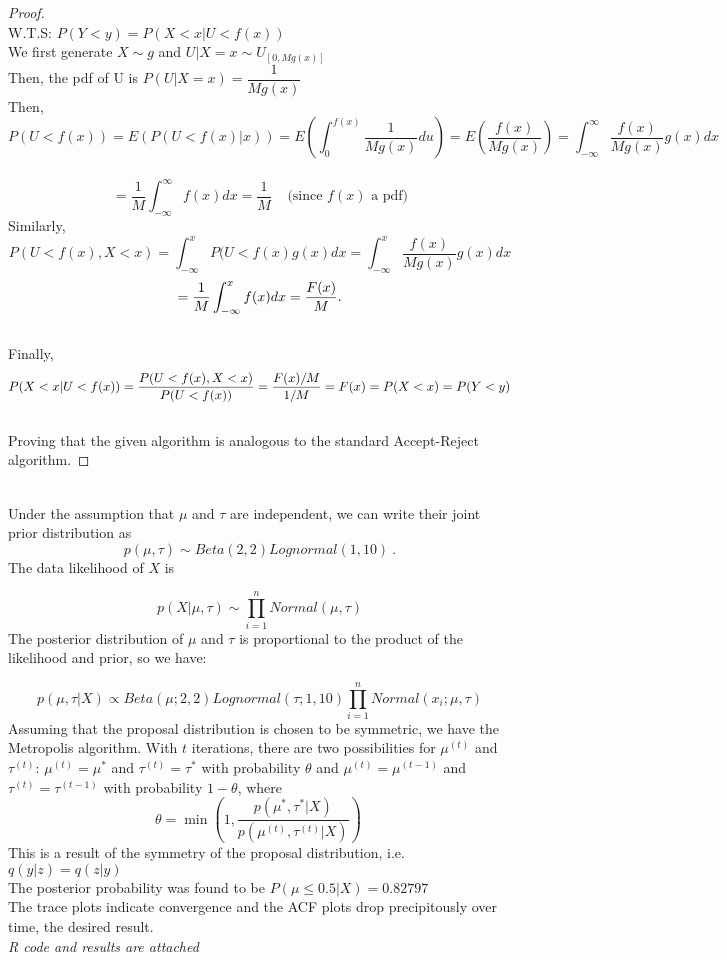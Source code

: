 \documentclass[10pt,a4paper]{article}
\begin{document}
\begin{problem}{2}
\begin{proof}
\text{ }\\
W.T.S: $P(Y<y)=P(X<x|U<f(x)) $\\
We first generate $X\sim g$ and $U|X=x\sim U_{[0,Mg(x)]}$\\
Then, the pdf of U is $P(U|X=x)=\dfrac{1}{Mg(x)}$\\
Then,
$$P(U<f(x))= E(P(U<f(x)|x))=E(\int_{0}^{f(x)}\frac{1}{Mg(x)}du)=E(\frac{f(x)}{Mg(x)})=\int_{-\infty}^{\infty}\frac{f(x)}{Mg(x)}g(x)dx$$\\
$$=\frac{1}{M}\int_{-\infty}^{\infty}f(x)dx
=\frac{1}{M} \ \ \ \ \ \textrm{(since $f(x)$ a pdf)}$$
Similarly,
$$P(U<f(x), X<x)=\int_{-\infty}^{x}P(U<f(x)g(x)dx=\int_{-\infty}^{x}\frac{f(x)}{Mg(x)}g(x)dx$$
$$=\frac{1}{M}\int_{-\infty}^{x}f(x)dx\\
=\frac{F(x)}{M}.$$\\
Finally,\\
$$P(X<x|U<f(x))=\frac{P(U<f(x),X<x)}{P(U<f(x))} \\
=\frac{F(x)/M}{1/M}\\
=F(x)\\
=P(X<x)\\
=P(Y<y)$$\\
Proving that the given algorithm is analogous to the standard Accept-Reject algorithm.
\end{proof}
\end{problem}


\begin{problem}{3}
\text{ }\\
Under the assumption that $\mu$ and $\tau$ are independent, we can write their joint prior distribution as
$$
p(\mu,\tau)\sim Beta(2,2)Lognormal(1,10)\ .
$$
The data likelihood of $X$ is

$$p(X|\displaystyle \mu,\tau)\sim\prod_{i=1}^{n} Normal(\mu, \tau)$$
The posterior distribution of $\mu$ and $\tau$ is proportional to the product of the likelihood and prior, so we have:

$$p(\mu,\tau|X)\propto Beta(\mu; 2,2) Lognormal(\displaystyle \tau;1,10)\prod_{i=1}^{n} Normal(x_i; \mu, \tau)$$
Assuming that the proposal distribution is chosen to be symmetric, we have the Metropolis algorithm. With $t$ iterations, there are two possibilities for $\mu^{(t)}$ and $\tau^{(t)}$: $\mu^{(t)}=\mu^{*}$ and $\tau^{(t)}=\tau^{*}$ with probability $\theta$ and $\mu^{(t)}=\mu^{(t-1)}$ and $\tau^{(t)}=\tau^{(t-1)}$ with probability $1-\theta$, where 
$$
\theta=\min(1,\frac{p(\mu^{*},\tau^{*}|X)}{p(\mu^{(t)},\tau^{(t)}|X)})\
$$
This is a result of the symmetry of the proposal distribution, i.e. $q(y|z)=q(z|y)$\\
The posterior probability was found to be $P(\mu\leq 0.5|X)=0.82797$\\
The trace plots indicate convergence and the ACF plots drop precipitously over time, the desired result.\\ 
\textit{R code and results are attached}

\end{problem}
 
\end{document}
